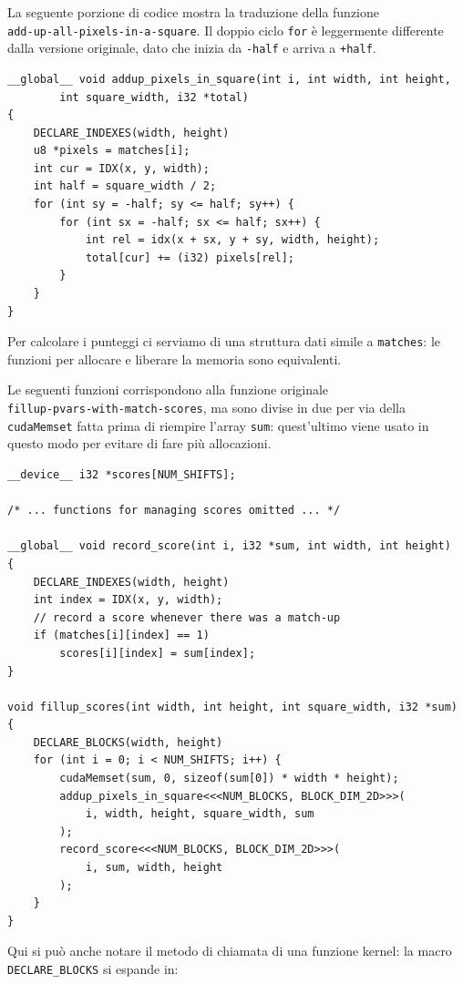 \documentclass[12pt,a4paper,openright,twoside]{report}
\begin{document}
La seguente porzione di codice mostra la traduzione della funzione \\ \verb|add-up-all-pixels-in-a-square|. Il doppio ciclo \verb|for| è leggermente differente dalla versione originale, dato che inizia da \verb|-half| e arriva a \verb|+half|.

\begin{lstlisting}[style=mystyle]
__global__ void addup_pixels_in_square(int i, int width, int height,
        int square_width, i32 *total)
{
    DECLARE_INDEXES(width, height)
    u8 *pixels = matches[i];
    int cur = IDX(x, y, width);
    int half = square_width / 2;
    for (int sy = -half; sy <= half; sy++) {
        for (int sx = -half; sx <= half; sx++) {
            int rel = idx(x + sx, y + sy, width, height);
            total[cur] += (i32) pixels[rel];
        }
    }
}
\end{lstlisting}

Per calcolare i punteggi ci serviamo di una struttura dati simile a \verb|matches|: le funzioni per allocare e liberare la memoria sono equivalenti.

Le seguenti funzioni corrispondono alla funzione originale \\ \verb|fillup-pvars-with-match-scores|, ma sono divise in due per via della \verb|cudaMemset| fatta prima di riempire l'array \verb|sum|: quest'ultimo viene usato in questo modo per evitare di fare più allocazioni.

\begin{lstlisting}[style=mystyle]
__device__ i32 *scores[NUM_SHIFTS];

/* ... functions for managing scores omitted ... */

__global__ void record_score(int i, i32 *sum, int width, int height)
{
    DECLARE_INDEXES(width, height)
    int index = IDX(x, y, width);
    // record a score whenever there was a match-up
    if (matches[i][index] == 1)
        scores[i][index] = sum[index];
}

void fillup_scores(int width, int height, int square_width, i32 *sum)
{
    DECLARE_BLOCKS(width, height)
    for (int i = 0; i < NUM_SHIFTS; i++) {
        cudaMemset(sum, 0, sizeof(sum[0]) * width * height);
        addup_pixels_in_square<<<NUM_BLOCKS, BLOCK_DIM_2D>>>(
            i, width, height, square_width, sum
        );
        record_score<<<NUM_BLOCKS, BLOCK_DIM_2D>>>(
            i, sum, width, height
        );
    }
}
\end{lstlisting}

Qui si può anche notare il metodo di chiamata di una funzione kernel: la macro \verb|DECLARE_BLOCKS| si espande in:
\end{document}
